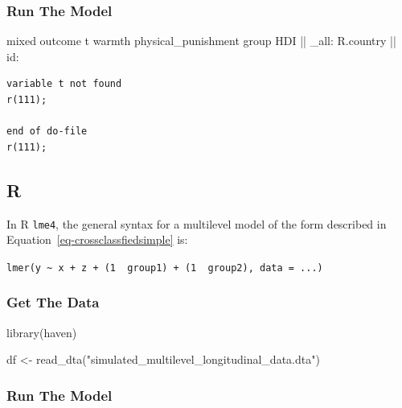 \documentclass[
  letterpaper,
  DIV=11,
  numbers=noendperiod]{scrreprt}
\newenvironment{Shaded}{\begin{snugshade}}{\end{snugshade}}
\newcommand{\DataTypeTok}[1]{\textcolor[rgb]{0.68,0.00,0.00}{#1}}
\newcommand{\FunctionTok}[1]{\textcolor[rgb]{0.28,0.35,0.67}{#1}}
\newcommand{\NormalTok}[1]{\textcolor[rgb]{0.00,0.23,0.31}{#1}}
\newcommand{\OtherTok}[1]{\textcolor[rgb]{0.00,0.23,0.31}{#1}}
\newcommand{\StringTok}[1]{\textcolor[rgb]{0.13,0.47,0.30}{#1}}
\begin{document}
\hypertarget{run-the-model-3}{%
\subsubsection{Run The Model}\label{run-the-model-3}}

\begin{Shaded}
\begin{Highlighting}[]

\NormalTok{mixed outcome t warmth physical\_punishment }\FunctionTok{group}\NormalTok{ HDI || }\DataTypeTok{\_all}\NormalTok{: R.country || id:}
\end{Highlighting}
\end{Shaded}

\begin{verbatim}
variable t not found
r(111);

end of do-file
r(111);
\end{verbatim}

\subsection{R}

In R \texttt{lme4}, the general syntax for a multilevel model of the
form described in Equation~\ref{eq-crossclassfiedsimple} is:

\texttt{lmer(y\ \textasciitilde{}\ x\ +\ z\ +\ (1\ \textbar{}\ group1)\ +\ (1\ \textbar{}\ group2),\ data\ =\ ...)}

\hypertarget{get-the-data-3}{%
\subsubsection{Get The Data}\label{get-the-data-3}}

\begin{Shaded}
\begin{Highlighting}[]
\FunctionTok{library}\NormalTok{(haven)}

\NormalTok{df }\OtherTok{\textless{}{-}} \FunctionTok{read\_dta}\NormalTok{(}\StringTok{"simulated\_multilevel\_longitudinal\_data.dta"}\NormalTok{)}
\end{Highlighting}
\end{Shaded}

\hypertarget{run-the-model-4}{%
\subsubsection{Run The Model}\label{run-the-model-4}}
\end{document}
